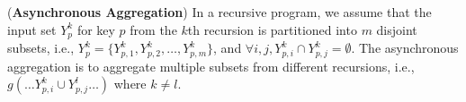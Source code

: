 \begin{comment}
\begin{definition}
	(\textbf{Asynchronous Aggregation}) In a recursive program, for an aggregation g() we assume that the input  $x$  is partitioned into $m$ disjoint subsets by the recursion,and denote as $x^{r_i}$ i.e., $x=\{x^{r_1},x^{r_2},\ldots,x^{r_m}\}$, and $\forall i,j, x^{r_i}\cap x^{r_j}=\emptyset$. Asynchronous aggregation is to aggregate multiple subsets from different recursions,i.e.$g(x)=g(x^{r_1},x^{r_2},\ldots,x^{r_m})$.

For a group-by aggregate operation. the inputs can be partition by their keys i.e.$X=\{X_{k_0},X_{k_1}\ldots,X_{k_n}\}$, or by the iterations i.e.$X=\{X^{r_0},X^{r_1}\ldots,X^{r_m}\}$ in which $X^{r_i}$ denote the subset in its $i$th recursion from all the keys, i.e.$X^{r_i}=\{X_{k_0}^i\cup X_{k_1}^i\cup ....\cup X_{k_n}\}$.Supposed the inputs $X$ come from $m$ different recursion, The asynchronous group-by  aggregation is defined as $G(X)=G(X^{r_0},X^{r_1}\ldots X^{r_m})$
\end{definition}

From the definition of recursive aggregation as shown in Equation (\ref{eq:recursive2}), $X^{k+1}$ is resulted from $Y^k$, and $Y^k$ is resulted from $X^k$. $X^{k+1}$ does not exist before applying $g()$ on the complete set of $X^k$. Thus, the asynchronous aggregation $g(\ldots X_i^k\cup X_j^{k+1} \ldots)$ is only possible after the $j$th subset of $X^{k+1}$ is obtained. In other words, $X^{k+1}$ is a \emph{replacement} of $X^k$ and is closer to the final result. The asynchronous aggregation of $X^{k+1}$ and $X^k$ may result in a wrong result since $X^k$ is a replaced result which is not supposed to be aggregated.
\end{comment}

\begin{definition}
	\label{def:asyncaggre}
	(\textbf{Asynchronous Aggregation}) In a recursive program, we assume that the input set $Y_{p}^k$ for key $p$ from the $k$th recursion is partitioned into $m$ disjoint subsets, i.e., $Y_{p}^k=\{Y_{p,1}^k,Y_{p,2}^k,\ldots,Y_{p,m}^k\}$, and $\forall i,j, Y_{p,i}^k\cap Y_{p,j}^k=\emptyset$. The asynchronous aggregation is to aggregate multiple subsets from different recursions, i.e., $g(\ldots Y_{p,i}^k\cup Y_{p,j}^{l}\ldots)$ where $k\neq l$.
\end{definition}

